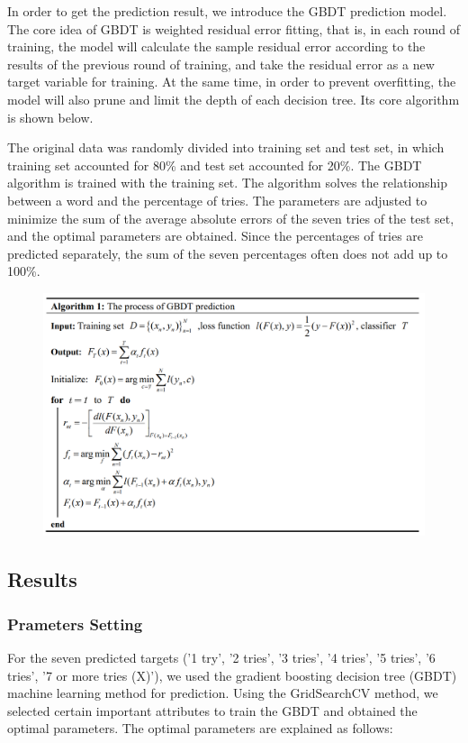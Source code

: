 \documentclass[
  journal=medium,
  manuscript=Report,
  year=2023,
  volume=37,
]{cup-journal}
\begin{document}
In order to get the prediction result, we introduce the GBDT prediction model. The core idea of GBDT is weighted residual error fitting, that is, in each round of training, the model will calculate the sample residual error according to the results of the previous round of training, and take the residual error as a new target variable for training. At the same time, in order to prevent overfitting, the model will also prune and limit the depth of each decision tree. Its core algorithm is shown below.

The original data was randomly divided into training set and test set, in which training set accounted for 80\% and test set accounted for 20\%. The GBDT algorithm is trained with the training set. The algorithm solves the relationship between a word and the percentage of tries. The parameters are adjusted to minimize the sum of the average absolute errors of the seven tries of the test set, and the optimal parameters are obtained. Since the percentages of tries are predicted separately, the sum of the seven percentages often does not add up to 100\%.

\begin{figure}[hbt!]
    \centering
    \includegraphics[width=0.9\linewidth]{pic/GBDT伪代码.png}
    \label{GBDT}
\end{figure}

\subsection{Results}
\subsubsection{Prameters Setting}

For the seven predicted targets ('1 try', '2 tries', '3 tries', '4 tries', '5 tries', '6 tries', '7 or more tries (X)'), we used the gradient boosting decision tree (GBDT) machine learning method for prediction. Using the GridSearchCV method, we selected certain important attributes to train the GBDT and obtained the optimal parameters. The optimal parameters are explained as follows: 
\end{document}
